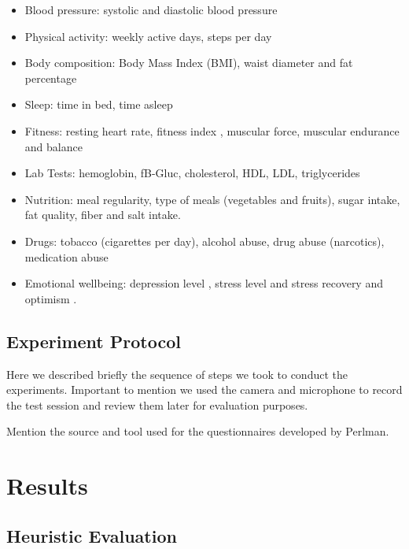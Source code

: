 \documentclass[twocolumn]{bmcart}%
\begin{document}
\begin{itemize}
	\item Blood pressure: systolic and diastolic blood pressure 
    \item Physical activity: weekly active days\cite{us2008physical, physical2008physical}, steps per day \cite{tudor2004many} 
    \item Body composition: Body Mass Index (BMI), waist diameter and fat percentage
    \item Sleep: time in bed, time asleep  
    \item Fitness: resting heart rate, fitness index \cite{oja2013tester,laukkanen1992validity}, muscular force, muscular endurance and balance \cite{suni2009fitness}
    \item Lab Tests: hemoglobin, fB-Gluc, cholesterol, HDL, LDL, triglycerides 
    \item Nutrition: meal regularity, type of meals (vegetables and fruits), sugar intake, fat quality, fiber and salt intake.
    \item Drugs: tobacco (cigarettes per day), alcohol abuse, drug abuse (narcotics), medication abuse
    \item Emotional wellbeing: depression level \cite{poutanen2010validity}, stress level and stress recovery \cite{firstbeat2014, teisala2014associations} and optimism \cite{scheier1994distinguishing}.
\end{itemize}	

\subsection*{Experiment Protocol}

Here we described briefly the sequence of steps we took to conduct the experiments. Important to mention we used the camera and microphone to record the test session and review them later for evaluation purposes. 

Mention the source and tool used for the questionnaires developed by Perlman.

\section*{Results}

\subsection*{Heuristic Evaluation}
\end{document}
